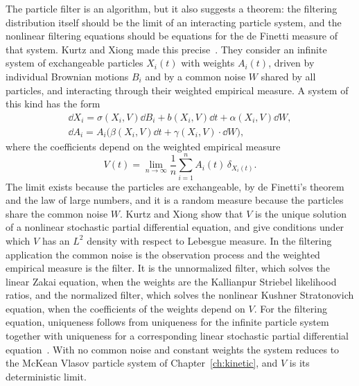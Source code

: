 The particle filter is an algorithm, but it also suggests a theorem: the filtering distribution itself should be the limit of an interacting particle system, and the nonlinear filtering equations should be equations for the de Finetti measure of that system. Kurtz and Xiong made this precise~\cite{kurtzxiong1999}. They consider an infinite system of exchangeable particles $X_i(t)$ with weights $A_i(t)$, driven by individual Brownian motions $B_i$ and by a common noise $W$ shared by all particles, and interacting through their weighted empirical measure. A system of this kind has the form
\[
\begin{gathered}\dd X_i = \sigma(X_i,V)\dd B_i+b(X_i,V)\dd t+\alpha(X_i,V)\dd W,\\ \dd A_i = A_i\big(\beta(X_i,V)\dd t+\gamma(X_i,V)\cdot\dd W\big),\end{gathered}
\]
where the coefficients depend on the weighted empirical measure
\[
V(t) = \lim_{n\to\infty}\frac1n\sum_{i=1}^nA_i(t)\,\delta_{X_i(t)}.
\]
The limit exists because the particles are exchangeable, by de Finetti's theorem and the law of large numbers, and it is a random measure because the particles share the common noise $W$. Kurtz and Xiong show that $V$ is the unique solution of a nonlinear stochastic partial differential equation, and give conditions under which $V$ has an $L^2$ density with respect to Lebesgue measure. In the filtering application the common noise is the observation process and the weighted empirical measure is the filter. It is the unnormalized filter, which solves the linear Zakai equation, when the weights are the Kallianpur Striebel likelihood ratios, and the normalized filter, which solves the nonlinear Kushner Stratonovich equation, when the coefficients of the weights depend on $V$. For the filtering equation, uniqueness follows from uniqueness for the infinite particle system together with uniqueness for a corresponding linear stochastic partial differential equation~\cite[Chapter~7]{xiong2008}. With no common noise and constant weights the system reduces to the McKean Vlasov particle system of Chapter~\ref{ch:kinetic}, and $V$ is its deterministic limit.

